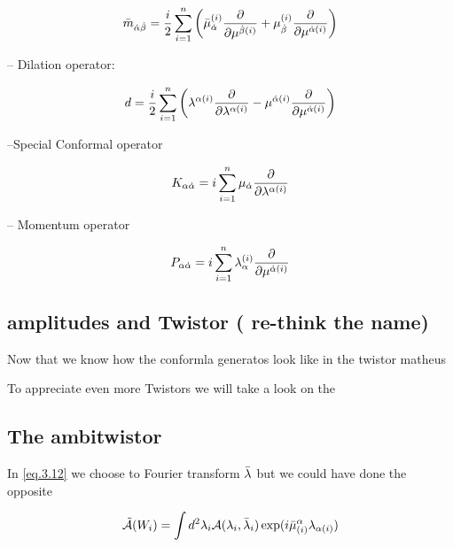 \begin{equation}
 \bar{m}_{\dot{\alpha} \dot{\beta}} = \frac{i}{2} \sum_{i=1}^{n} \left(  \bar{\mu}_{\dot{\alpha}}^{(i)} \frac{\partial}{\partial \mu^{\dot{\beta}(i)}}  + \mu_{\dot{\beta}}^{(i)} \frac{\partial}{\partial \mu^{\dot{\alpha}(i)}}  \right)
\end{equation}


-- Dilation operator:

\begin{equation}
d = \frac{i}{2} \sum_{i=1}^{n} \left( \lambda^{\alpha(i)} \frac{\partial}{\partial \lambda^{\alpha(i)}}  - \mu^{\dot{\alpha}(i)} \frac{\partial}{\partial \mu^{\dot{\alpha}(i)}} \right) 
\end{equation}

--Special Conformal operator

\begin{equation}
K_{\alpha \dot{\alpha}} = i\sum_{i=1}^{n}  \mu_{\dot{\alpha}}\frac{\partial}{\partial \lambda^{\alpha(i)} }
\end{equation}

-- Momentum operator 


\begin{equation}
P_{\alpha \dot{\alpha}} = i\sum_{i=1}^{n}  \lambda_{\alpha}^{(i)}\frac{\partial}{\partial \mu^{\dot{\alpha}(i)} }
\end{equation}

\subsection{amplitudes and Twistor ( re-think the name) }




Now that we know how the conformla generatos look like in the twistor matheus

To appreciate even more Twistors we will take a look on the












\subsection{The ambitwistor }

In \eqref{eq.3.12} we choose to Fourier transform $\bar{\lambda}$ but we could have done the opposite 



\begin{equation}
\tilde{\mathcal{A}}(W_{i}) = \int d^{2}\lambda_{i}\mathcal{A}(\lambda_{i},\bar{\lambda}_{i}) \exp(i\bar{\mu}^{\alpha}_{(i)}\lambda_{\alpha(i)})  
\end{equation}

